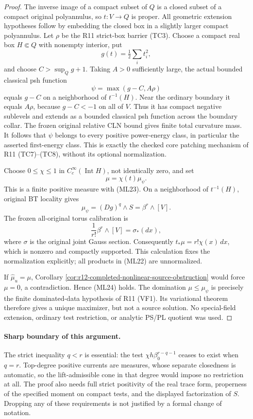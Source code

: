 \documentclass[11pt,a4paper]{article}
\numberwithin{equation}{section}
\theoremstyle{definition}
\theoremstyle{remark}
\begin{document}
\begin{proof}
The inverse image of a compact subset of $Q$ is a closed subset
of a compact original polyannulus, so $t:V\to Q$ is proper.
All geometric extension hypotheses follow by embedding the
closed box in a slightly larger compact polyannulus.
Let $\rho$ be the R11 strict-box barrier \textup{(TC3)}.
Choose a compact real box $H\Subset Q$ with nonempty interior,
put
\[
                    g(t)=\tfrac12\sum_i t_i^2,
\]
and choose $C>\sup_Qg+1$.  Taking $A>0$ sufficiently large,
the actual bounded classical psh function
\[
                         \psi=\max(g-C,A\rho)
 \tag{ML25}
\]
equals $g-C$ on a neighborhood of $t^{-1}(H)$.
Near the ordinary boundary it equals $A\rho$, because
$g-C<-1$ on all of $V$.  Thus it has compact negative
sublevels and extends as a bounded classical psh function
across the boundary collar.  The frozen original relative CLN
bound gives finite total curvature mass.  It follows that
$\psi$ belongs to every positive power-energy class, in
particular the asserted first-energy class.  This is exactly
the checked core patching mechanism of R11
\textup{(TC7)--(TC8)}, without its optional normalization.

Choose $0\le\chi\le1$ in $C_c^\infty(\operatorname{Int}H)$,
not identically zero, and set
\[
                           \mu=\chi(t)\mu_\psi.
 \tag{ML26}
\]
This is a finite positive measure with \textup{(ML23)}.
On a neighborhood of $t^{-1}(H)$, original BT locality gives
\[
                  \mu_\psi=(Dg)^q\wedge S
                             =\beta^r\wedge[V].
 \tag{ML27}
\]
The frozen all-original torus calibration is
\[
             \frac1{r!}\beta^r\wedge[V]=\sigma_*(dx),
 \tag{ML28}
\]
where $\sigma$ is the original joint Gauss section.  Consequently
$t_*\mu=r!\chi(x)\,dx$, which is nonzero and compactly
supported.  This calculation fixes the normalization explicitly;
all products in \textup{(ML22)} are unnormalized.

If $\widehat\mu_u=\mu$, Corollary
\ref{cor:r12-completed-nonlinear-source-obstruction} would force
$\mu=0$, a contradiction.  Hence \textup{(ML24)} holds.
The domination $\mu\le\mu_\psi$ is precisely the finite
dominated-data hypothesis of R11 \textup{(VF1)}.  Its variational
theorem therefore gives a unique maximizer, but not a source
solution.  No special-field extension, ordinary test restriction,
or analytic PS/PL quotient was used.
\end{proof}

\paragraph{Sharp boundary of this argument.}
The strict inequality $q<r$ is essential: the test
$\chi h\beta_0^{r-q-1}$ ceases to exist when $q=r$.
Top-degree positive currents are measures, whose separate
closedness is automatic, so the lift-admissible cone in that
degree would impose no restriction at all.  The proof also
needs full strict positivity of the real trace form, properness
of the specified moment on compact tests, and the displayed
factorization of $S$.  Dropping any of these requirements is
not justified by a formal change of notation.
\end{document}
